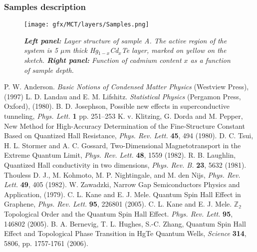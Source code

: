 \documentclass[titlepage,a4paper]{book}
\newcommand{\wciecie}{\quad\phantom{v}}
\begin{document}
\subsubsection{Samples description}
\wciecie
\begin{figure}[ht]
	\centering
	\texttt{[image: gfx/MCT/layers/Samples.png]}
	\vspace{-10pt}
	\caption{\textit{\textbf{Left panel:} Layer structure of sample A. The active region of the system is 5 $\mu$m thick Hg$_{1-x}$Cd$_x$Te layer, marked on yellow on the sketch. \textbf{Right panel:} Function of cadmium content $x$ as a function of sample depth.}}
	\label{fig:Samples_layers}
\end{figure} 




\begin{thebibliography}{99}
P. W. Anderson. \textit{Basic Notions of Condensed Matter Physics} (Westview Press), (1997)
L. D. Landau and E. M. Lifshitz. \textit{Statistical Physics} (Pergamon Press, Oxford), (1980).
B. D. Josephson, Possible new effects in superconductive tunneling, \textit{Phys. Lett.} \textbf{1} pp. 251–253 
K. v. Klitzing, G. Dorda and M. Pepper, New Method for High-Accuracy Determination of the Fine-Structure Constant Based on Quantized Hall Resistance, \textit{Phys. Rev. Lett.} \textbf{45}, 494 (1980).
D. C. Tsui, H. L. Stormer and A. C. Gossard, Two-Dimensional Magnetotransport in the Extreme Quantum Limit, \textit{Phys. Rev. Lett.} \textbf{48}, 1559 (1982).
R. B. Laughlin, Quantized Hall conductivity in two dimensions, \textit{Phys. Rev. B.} \textbf{23}, 5632 (1981).
Thouless D. J., M. Kohmoto, M. P. Nightingale, and M. den Nijs, \textit{Phys. Rev. Lett.} \textbf{49}, 405 (1982).
W. Zawadzki, Narrow Gap Semiconductors Physics and Application, (1979).
C. L. Kane and E. J. Mele. Quantum Spin Hall Effect in Graphene, \textit{Phys. Rev. Lett.} \textbf{95}, 226801 (2005).
C. L. Kane and E. J. Mele. $\mathbb{Z_2}$ Topological Order and the Quantum Spin Hall Effect. \textit{Phys. Rev. Lett.} \textbf{95}, 146802 (2005).
B. A. Bernevig, T. L. Hughes, S.-C. Zhang, Quantum Spin Hall Effect and Topological Phase Transition in HgTe Quantum Wells, \textit{Science} \textbf{314}, 5806, pp. 1757-1761 (2006).

\end{thebibliography}
\end{document}
